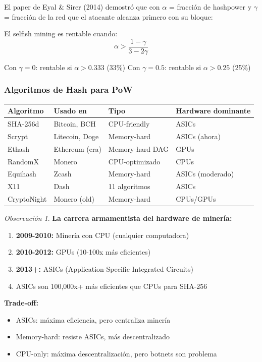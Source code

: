 \documentclass[11pt,a4paper,twoside,openright]{book}
\theoremstyle{definition}
\theoremstyle{plain}
\theoremstyle{remark}
\newtheorem{remark}{Observación}[chapter]
\begin{document}
\begin{mathnote}
El paper de Eyal \& Sirer (2014) demostró que con $\alpha$ = fracción de hashpower y $\gamma$ = fracción de la red que el atacante alcanza primero con su bloque:

El selfish mining es rentable cuando:
\[ \alpha > \frac{1 - \gamma}{3 - 2\gamma} \]

Con $\gamma = 0$: rentable si $\alpha > 0.333$ (33\%)
Con $\gamma = 0.5$: rentable si $\alpha > 0.25$ (25\%)
\end{mathnote}

\subsubsection{Algoritmos de Hash para PoW}

\begin{center}
\begin{tabular}{llll}
\toprule
\textbf{Algoritmo} & \textbf{Usado en} & \textbf{Tipo} & \textbf{Hardware dominante} \\
\midrule
SHA-256d & Bitcoin, BCH & CPU-friendly & ASICs \\
Scrypt & Litecoin, Doge & Memory-hard & ASICs (ahora) \\
Ethash & Ethereum (era) & Memory-hard DAG & GPUs \\
RandomX & Monero & CPU-optimizado & CPUs \\
Equihash & Zcash & Memory-hard & ASICs (moderado) \\
X11 & Dash & 11 algoritmos & ASICs \\
CryptoNight & Monero (old) & Memory-hard & CPUs/GPUs \\
\bottomrule
\end{tabular}
\end{center}

\begin{remark}
\textbf{La carrera armamentista del hardware de minería:}

\begin{enumerate}
    \item \textbf{2009-2010:} Minería con CPU (cualquier computadora)
    \item \textbf{2010-2012:} GPUs (10-100x más eficientes)
    \item \textbf{2013+:} ASICs (Application-Specific Integrated Circuits)
    \item ASICs son 100,000x+ más eficientes que CPUs para SHA-256
\end{enumerate}

\textbf{Trade-off:}
\begin{itemize}
    \item ASICs: máxima eficiencia, pero centraliza minería
    \item Memory-hard: resiste ASICs, más descentralizado
    \item CPU-only: máxima descentralización, pero botnets son problema
\end{itemize}
\end{remark}
\end{document}
